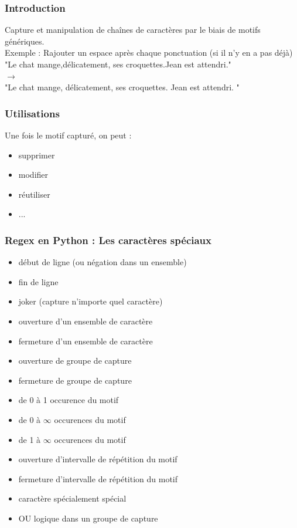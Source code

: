\begin{frame}
  \frametitle{Introduction}
  Capture et manipulation de chaînes de caractères par le biais de motifs génériques. \\
  \newline
  Exemple : Rajouter un espace après chaque ponctuation (si il n'y en a pas déjà) \\
  \newline
  "Le chat mange,délicatement, ses croquettes.Jean est attendri." \\
  $\rightarrow$ \\
  "Le chat mange, délicatement, ses croquettes. Jean est attendri. " \\
\end{frame}

\begin{frame}
  \frametitle{Utilisations}
  Une fois le motif capturé, on peut :
  \begin{itemize}
  \item supprimer
  \item modifier
  \item réutiliser
  \item ...
  \end{itemize}
\end{frame}

\begin{frame}
  \frametitle{Regex en Python : Les caractères spéciaux}
  \begin{itemize}
  \item \makebox[1cm][c]{\^{}} début de ligne (ou négation dans un ensemble)
  \item \makebox[1cm][c]{\$} fin de ligne
  \item {} joker (capture n'importe quel caractère) 
  \item \makebox[1cm][c]{[} ouverture d'un ensemble de caractère
  \item \makebox[1cm][c]{]} fermeture d'un ensemble de caractère
  \item \makebox[1cm][c]{(} ouverture de groupe de capture
  \item \makebox[1cm][c]{)} fermeture de groupe de capture
  \item {} de 0 à 1 occurence du motif
  \item \makebox[1cm][c]{*} de 0 à $\infty$ occurences du motif
  \item \makebox[1cm][c]{+} de 1 à $\infty$ occurences du motif
  \item \makebox[1cm][c]{\{} ouverture d'intervalle de répétition du motif
  \item \makebox[1cm][c]{\}} fermeture d'intervalle de répétition du motif
  \item \makebox[1cm][c]{\textbackslash} caractère spécialement spécial
  \item \makebox[1cm][c]{\textbar} OU logique dans un groupe de capture
  \end{itemize}
\end{frame}

